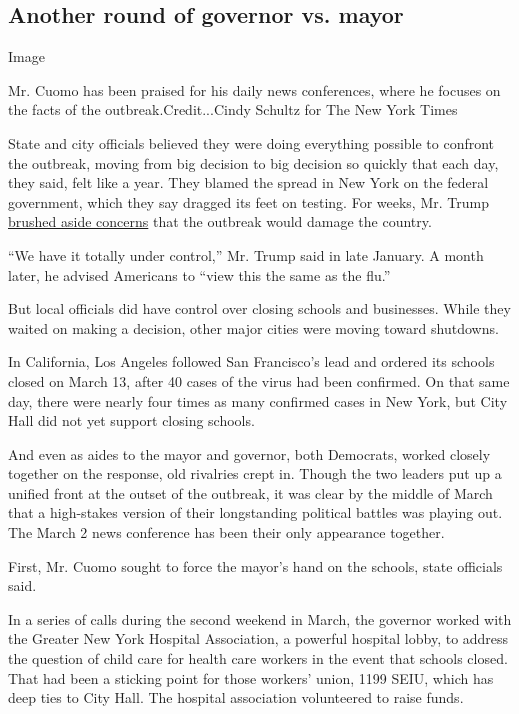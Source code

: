 \hypertarget{another-round-of-governor-vs-mayor}{%
\subsection{Another round of governor vs.
mayor}\label{another-round-of-governor-vs-mayor}}

Image

Mr. Cuomo has been praised for his daily news conferences, where he
focuses on the facts of the outbreak.Credit...Cindy Schultz for The New
York Times

State and city officials believed they were doing everything possible to
confront the outbreak, moving from big decision to big decision so
quickly that each day, they said, felt like a year. They blamed the
spread in New York on the federal government, which they say dragged its
feet on testing. For weeks, Mr. Trump
\href{https://www.nytimes.com/video/us/politics/100000007067717/trumps-coronavirus-statements.html}{brushed
aside concerns} that the outbreak would damage the country.

``We have it totally under control,'' Mr. Trump said in late January. A
month later, he advised Americans to ``view this the same as the flu.''

But local officials did have control over closing schools and
businesses. While they waited on making a decision, other major cities
were moving toward shutdowns.

In California, Los Angeles followed San Francisco's lead and ordered its
schools closed on March 13, after 40 cases of the virus had been
confirmed. On that same day, there were nearly four times as many
confirmed cases in New York, but City Hall did not yet support closing
schools.

And even as aides to the mayor and governor, both Democrats, worked
closely together on the response, old rivalries crept in. Though the two
leaders put up a unified front at the outset of the outbreak, it was
clear by the middle of March that a high-stakes version of their
longstanding political battles was playing out. The March 2 news
conference has been their only appearance together.

First, Mr. Cuomo sought to force the mayor's hand on the schools, state
officials said.

In a series of calls during the second weekend in March, the governor
worked with the Greater New York Hospital Association, a powerful
hospital lobby, to address the question of child care for health care
workers in the event that schools closed. That had been a sticking point
for those workers' union, 1199 SEIU, which has deep ties to City Hall.
The hospital association volunteered to raise funds.

